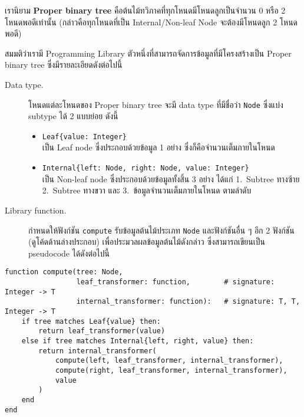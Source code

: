 \question{}

เรานิยาม \textbf{Proper binary tree} คือต้นไม้ทวิภาคที่ทุกโหนดมีโหนดลูกเป็นจำนวน 0 หรือ 2 โหนดพอดีเท่านั้น\;
(กล่าวคือทุกโหนดที่เป็น Internal/Non-leaf Node จะต้องมีโหนดลูก 2 โหนดพอดี)

สมมติว่าเรามี Programming Library ตัวหนึ่งที่สามารถจัดการข้อมูลที่มีโครงสร้างเป็น Proper binary tree 
ซึ่งมีรายละเอียดดังต่อไปนี้

\begin{description}
    \item[Data type.] โหนดแต่ละโหนดของ Proper binary tree จะมี data type ที่มีชื่อว่า 
        \lstinline{Node} ซึ่งแบ่ง subtype ได้ 2 แบบย่อย ดังนี้
        \begin{itemize}
            \item \lstinline|Leaf{value: Integer}| \\
                เป็น Leaf node ซึ่งประกอบด้วยข้อมูล 1 อย่าง ซึ่งก็คือจำนวนเต็มภายในโหนด
            \item \lstinline|Internal{left: Node, right: Node, value: Integer}| \\
                เป็น Non-leaf node ซึ่งประกอบด้วยข้อมูลทั้งสิ้น 3 อย่าง ได้แก่
                1.~Subtree ทางซ้าย 2.~Subtree ทางขวา 
                และ 3.~ข้อมูลจำนวนเต็มภายในโหนด ตามลำดับ
        \end{itemize}
    \item[Library function.] กำหนดให้ฟังก์ชัน \lstinline{compute} 
        รับข้อมูลต้นไม้ประเภท \lstinline{Node} และฟังก์ชันอื่น ๆ อีก 2 ฟังก์ชัน (ดูโค้ดด้านล่างประกอบ) 
        เพื่อประมวลผลข้อมูลต้นไม้ดังกล่าว ซึ่งสามารถเขียนเป็น pseudocode ได้ดังต่อไปนี้
\end{description}

\newpage
\vspace*{-2\baselineskip}
\begin{fullwidth}%
\begin{lstlisting}[language=pseudocode]
function compute(tree: Node,
                 leaf_transformer: function,        # signature: Integer -> T
                 internal_transformer: function):   # signature: T, T, Integer -> T
    if tree matches Leaf{value} then:
        return leaf_transformer(value)
    else if tree matches Internal{left, right, value} then:
        return internal_transformer(
            compute(left, leaf_transformer, internal_transformer), 
            compute(right, leaf_transformer, internal_transformer), 
            value
        )
    end
end
\end{lstlisting}
\end{fullwidth}

